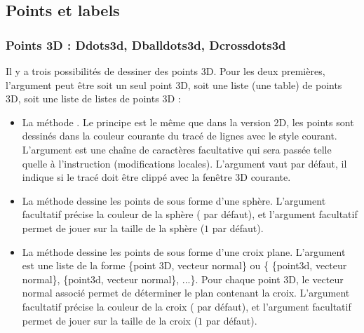 \subsection{Points et labels}

\subsubsection{Points 3D : Ddots3d, Dballdots3d, Dcrossdots3d}

Il y a trois possibilités de dessiner des points 3D. Pour les deux premières, l'argument  peut être soit un seul point 3D, soit une liste (une table) de points 3D, soit une liste de listes de points 3D :

\begin{itemize}
    \item La méthode . Le principe est le même que dans la version 2D, les points sont dessinés dans la couleur courante du tracé de lignes avec le style courant. L'argument  est une chaîne de caractères facultative qui sera passée telle quelle à l'instruction \drawcmd (modifications locales). L'argument  vaut \false par défaut, il indique si le tracé doit être clippé avec la fenêtre 3D courante.
    
    \item La méthode  dessine les points de  sous forme d'une sphère. L'argument facultatif  précise la couleur de la sphère ( par défaut), et l'argument facultatif  permet de jouer sur la taille de la sphère ($1$ par défaut).
    
    \item La méthode  dessine les points de  sous forme d'une croix plane. L'argument  est une liste de la forme \{point 3D, vecteur normal\} ou \{ \{point3d, vecteur normal\}, \{point3d, vecteur normal\}, ...\}. Pour chaque point 3D, le vecteur normal associé permet de déterminer le plan contenant la croix. L'argument facultatif  précise la couleur de la croix ( par défaut), et l'argument facultatif  permet de jouer sur la taille de la croix ($1$ par défaut).
\end{itemize}

